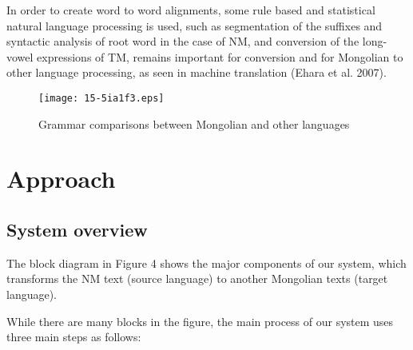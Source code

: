 \documentclass[english]{jnlp_1.4}
\begin{document}
In order to create word to word alignments, some rule based and statistical 
natural language processing is used, such as segmentation of the suffixes 
and syntactic analysis of root word in the case of NM, and conversion of the 
long-vowel expressions of TM, remains important for conversion and for 
Mongolian to other language processing, as seen in machine translation 
(Ehara et al. 2007).

\begin{figure}[t]
\centerline{\texttt{[image: 15-5ia1f3.eps]}}
\caption{Grammar comparisons between Mongolian and other languages}
\label{fig3}
\end{figure}



\section{Approach}


\subsection{System overview}

The block diagram in Figure 4 shows the major components of our system, 
which transforms the NM text (source language) to another Mongolian texts 
(target language).

While there are many blocks in the figure, the main process of our system 
uses three main steps as follows:
\end{document}
